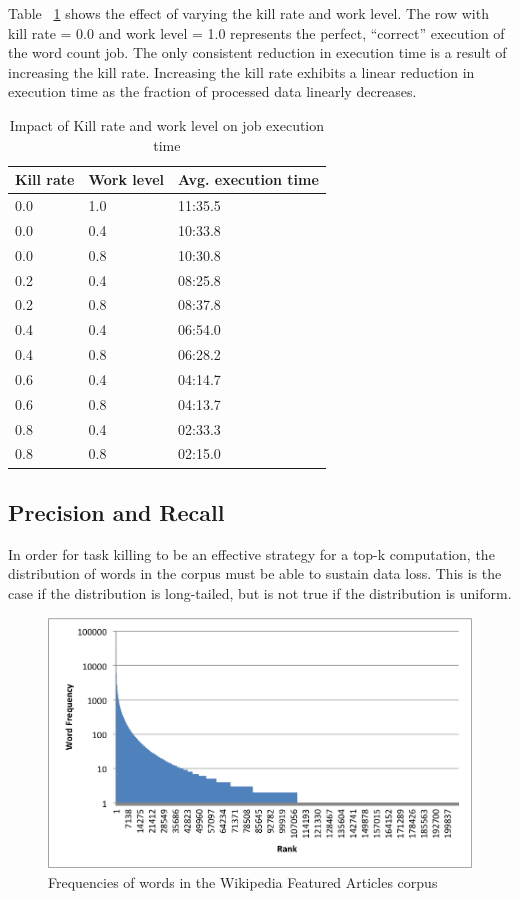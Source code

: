 \documentclass[12pt]{article}
\begin{document}
Table ~\ref{table:runtime} shows the effect of varying the kill rate and work level. The row with kill rate = 0.0 and work level = 1.0 represents the perfect, “correct” execution of the word count job. The only consistent reduction in execution time is a result of increasing the kill rate. Increasing the kill rate exhibits a linear reduction in execution time as the fraction of processed data linearly decreases.

\begin{table}
\begin{tabular}{|l|l|l|}
\hline
Kill rate & Work level & Avg. execution time \\ \hline
0.0 & 1.0 & 11:35.5 \\ \hline
0.0 & 0.4 & 10:33.8 \\ \hline
0.0 & 0.8 & 10:30.8 \\ \hline
0.2 & 0.4 & 08:25.8 \\ \hline
0.2 & 0.8 & 08:37.8 \\ \hline
0.4 & 0.4 & 06:54.0 \\ \hline
0.4 & 0.8 & 06:28.2 \\ \hline
0.6 & 0.4 & 04:14.7 \\ \hline
0.6 & 0.8 & 04:13.7 \\ \hline
0.8 & 0.4 & 02:33.3 \\ \hline
0.8 & 0.8 & 02:15.0 \\ \hline
\end{tabular}
\caption{Impact of Kill rate and work level on job execution time}
\label{table:runtime}
\end{table}

\subsection{Precision and Recall}
In order for task killing to be an effective strategy for a top-k computation, the distribution of words in the corpus must be able to sustain data loss. This is the case if the distribution is long-tailed, but is not true if the distribution is uniform.

\begin{figure}
\includegraphics[width=\linewidth]{long-tail-ranks.png}
\caption{Frequencies of words in the Wikipedia Featured Articles corpus}
\label{fig:wordDist}
\end{figure}
\end{document}
